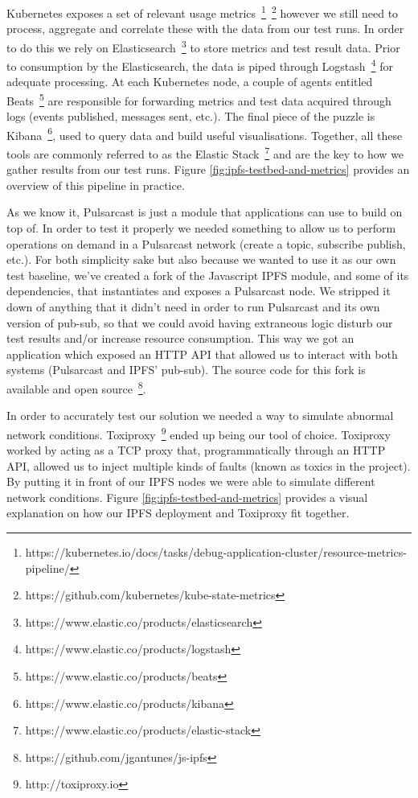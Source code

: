 Kubernetes exposes a set of relevant usage
metrics~\footnote{https://kubernetes.io/docs/tasks/debug-application-cluster/resource-metrics-pipeline/}~\footnote{https://github.com/kubernetes/kube-state-metrics}
however we still need to process, aggregate and correlate these with the data
from our test runs. In order to do this we rely on
Elasticsearch~\footnote{https://www.elastic.co/products/elasticsearch} to store
metrics and test result data. Prior to consumption by the Elasticsearch, the
data is piped through
Logstash~\footnote{https://www.elastic.co/products/logstash} for adequate
processing. At each Kubernetes node, a couple of agents entitled
Beats~\footnote{https://www.elastic.co/products/beats} are responsible for
forwarding metrics and test data acquired through logs (events published,
messages sent, etc.). The final piece of the puzzle is
Kibana~\footnote{https://www.elastic.co/products/kibana}, used to query data
and build useful visualisations. Together, all these tools are commonly
referred to as the Elastic
Stack~\footnote{https://www.elastic.co/products/elastic-stack} and are the key
to how we gather results from our test runs. Figure
\ref{fig:ipfs-testbed-and-metrics} provides an overview of this pipeline in
practice.

As we know it, Pulsarcast is just a module that applications can use to build
on top of. In order to test it properly we needed something to allow us to
perform operations on demand in a Pulsarcast network (create a topic, subscribe
publish, etc.). For both simplicity sake but also because we wanted to use it
as our own test baseline, we've created a fork of the Javascript IPFS module,
and some of its dependencies, that instantiates and exposes a Pulsarcast node.
We stripped it down of anything that it didn't need in order to run Pulsarcast
and its own version of pub-sub, so that we could avoid having extraneous logic
disturb our test results and/or increase resource consumption. This way we got
an application which exposed an HTTP API that allowed us to interact with both
systems (Pulsarcast and IPFS' pub-sub). The source code for this fork is
available and open source~\footnote{https://github.com/jgantunes/js-ipfs}.

In order to accurately test our solution we needed a way to simulate abnormal
network conditions. Toxiproxy~\footnote{http://toxiproxy.io} ended up being our
tool of choice. Toxiproxy worked by acting as a TCP proxy that,
programmatically through an HTTP API, allowed us to inject multiple kinds of
faults (known as toxics in the project). By putting it in front of our IPFS
nodes we were able to simulate different network conditions. Figure
\ref{fig:ipfs-testbed-and-metrics} provides a visual explanation on how our
IPFS deployment and Toxiproxy fit together.

